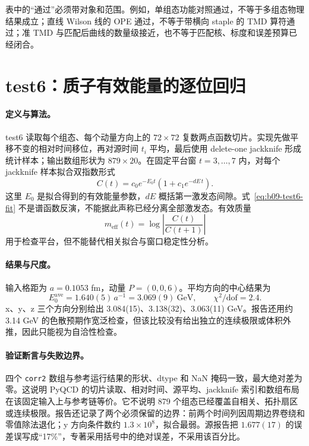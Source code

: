 表中的“通过”必须带对象和范围。例如，单组态功能对照通过，不等于多组态物理结果成立；直线 Wilson 线的 OPE 通过，不等于带横向 staple 的 TMD 算符通过；准 TMD 与匹配后曲线的数量级接近，也不等于匹配核、标度和误差预算已经闭合。

\section{test6：质子有效能量的逐位回归}

\paragraph{定义与算法。}
test6 读取每个组态、每个动量方向上的 \(72\times72\) 复数两点函数切片。实现先做平移不变的相对时间移位，再对源时间 \(t_i\) 平均，最后使用 delete-one jackknife 形成统计样本；输出数组形状为 \(879\times20\)。在固定平台窗 \(t=3,\ldots,7\) 内，对每个 jackknife 样本拟合双指数形式
\begin{equation}
  C(t)=c_0e^{-E_0t}\left(1+c_1e^{-dE\,t}\right).
  \label{eq:b09-test6-fit}
\end{equation}
这里 \(E_0\) 是拟合得到的有效能量参数，\(dE\) 概括第一激发态间隙。式~\eqref{eq:b09-test6-fit} 不是谱函数反演，不能据此声称已经分离全部激发态。有效质量
\begin{equation}
  m_{\mathrm{eff}}(t)=\log\left|\frac{C(t)}{C(t+1)}\right|
  \label{eq:b09-test6-meff}
\end{equation}
用于检查平台，但不能替代相关拟合与窗口稳定性分析。

\paragraph{结果与尺度。}
输入格距为 \(a=0.1053\) fm，动量 \(P=(0,0,6)\)。平均方向的中心结果为
\begin{equation}
  E_0^{\mathrm{ave}}=1.640(5)\,a^{-1}=3.069(9)\ \mathrm{GeV},
  \qquad \chi^2/\mathrm{dof}=2.4.
  \label{eq:b09-test6-result}
\end{equation}
x、y、z 三个方向分别给出 3.084(15)、3.138(32)、3.063(11) GeV。报告还用约 3.14 GeV 的色散预期作宽泛检查，但该比较没有给出独立的连续极限或体积外推，因此只能视为自洽性检查。

\paragraph{验证断言与失败边界。}
四个 \texttt{corr2} 数组与参考运行结果的形状、dtype 和 NaN 掩码一致，最大绝对差为零。这说明 PyQCD 的切片读取、相对时间、源平均、jackknife 索引和数组布局在该固定输入上与参考链等价。它不说明 879 个组态已经覆盖自相关、拓扑扇区或连续极限。报告还记录了两个必须保留的边界：前两个时间列因周期边界卷绕和零值除法退化；y 方向条件数约 \(1.3\times10^8\)，拟合最弱。源报告把 \(1.677(17)\) 的误差误写成“17\%”，专著采用括号中的绝对误差，不采用该百分比。

